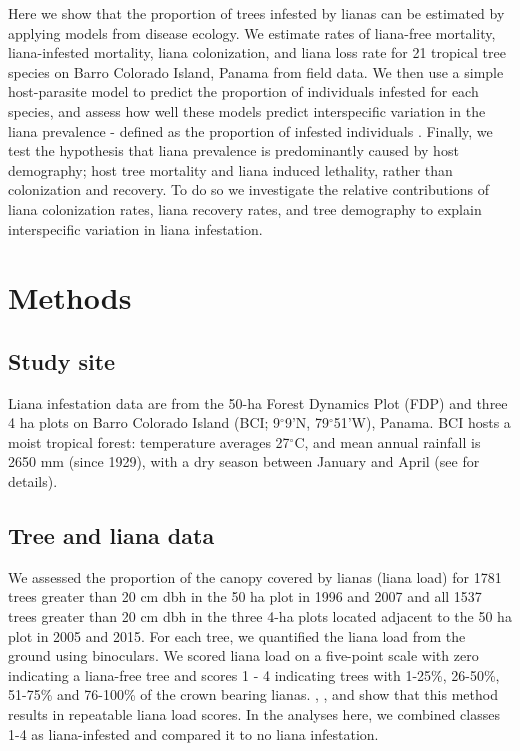\documentclass[b5paper,justified]{tufte-book} %
\begin{document}
\begin{fullwidth}
Here we show that the proportion of trees infested by lianas can be estimated by applying models from disease ecology. We estimate rates of liana-free mortality, liana-infested mortality, liana colonization, and liana loss rate for 21 tropical tree species on Barro Colorado Island, Panama from field data. We then use a simple host-parasite model to predict the proportion of individuals infested for each species, and assess how well these models predict interspecific variation in the liana prevalence -  defined as the proportion of infested individuals \citep[as in parasitology e.g.][]{Roberts2009}. Finally, we test the hypothesis that liana prevalence is predominantly caused by host demography; host tree mortality and liana induced lethality, rather than colonization and recovery. To do so we investigate the relative contributions of liana colonization rates, liana recovery rates, and tree demography to explain interspecific variation in liana infestation.

\section{Methods}

\subsection{Study site}
Liana infestation data are from the 50-ha Forest Dynamics Plot (FDP) and three 4 ha plots on Barro Colorado Island (BCI; 9$^{\circ}$9'N, 79$^{\circ}$51'W), Panama. BCI hosts a moist tropical forest: temperature averages 27$^\circ$C, and mean annual rainfall is 2650 mm (since 1929), with a dry season between January and April (see \citealt{Leigh1999} for details). 

\subsection{Tree and liana data }
We assessed the proportion of the canopy covered by lianas (liana load) for 1781 trees greater than 20 cm dbh in the 50 ha plot in 1996 and 2007 \citep{Wright2005, Ingwell2010} and all 1537 trees greater than 20 cm dbh in the three 4-ha plots located adjacent to the 50 ha plot in 2005 and 2015. For each tree, we quantified the liana load from the ground using binoculars. We scored liana load on a five-point scale with zero indicating a liana-free tree and scores 1 - 4 indicating trees with 1-25\%, 26-50\%, 51-75\% and 76-100\% of the crown bearing lianas. \citet{Ingwell2010}, \citet{Schnitzer2010}, \citet{Heijden2010} and \citet{Wright2015} show that this method results in repeatable liana load scores. In the analyses here, we combined classes 1-4 as liana-infested and compared it to no liana infestation.  


\end{fullwidth}
\end{document}

